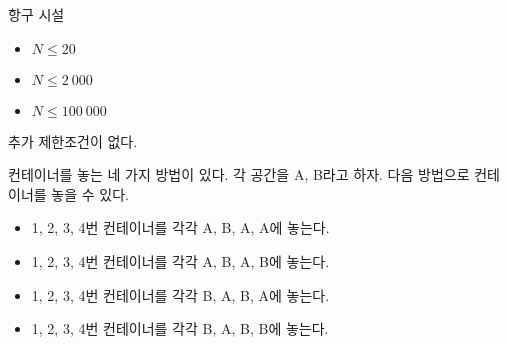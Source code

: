 \begin{problem}{항구 시설}
\begin{itemize}
	\item $N \le 20$
\end{itemize}

\begin{itemize}
	\item $N \le 2\ 000$
\end{itemize}

\begin{itemize}
	\item $N \le 100\ 000$
\end{itemize}



추가 제한조건이 없다.

\Examples

\begin{example}
\end{example}

컨테이너를 놓는 네 가지 방법이 있다. 각 공간을 A, B라고 하자. 다음 방법으로 컨테이너를 놓을 수 있다.

\begin{itemize}
	\item 1, 2, 3, 4번 컨테이너를 각각 A, B, A, A에 놓는다.
	\item 1, 2, 3, 4번 컨테이너를 각각 A, B, A, B에 놓는다.
	\item 1, 2, 3, 4번 컨테이너를 각각 B, A, B, A에 놓는다.
	\item 1, 2, 3, 4번 컨테이너를 각각 B, A, B, B에 놓는다.
\end{itemize}

\begin{example}
%
\end{example}


\end{problem}

